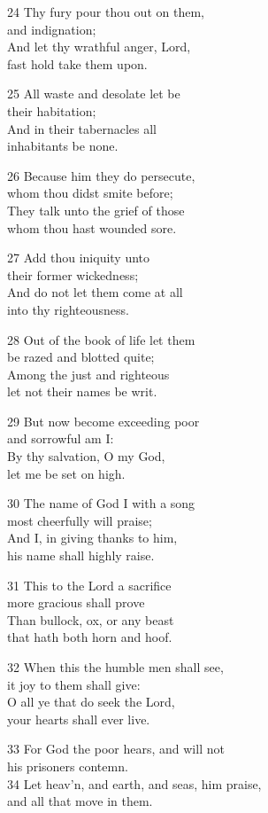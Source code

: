 \begin{multicols}{3}
24 Thy fury pour thou out on them,\\
and indignation;\\
And let thy wrathful anger, Lord,\\
fast hold take them upon.

25 All waste and desolate let be\\
their habitation;\\
And in their tabernacles all\\
inhabitants be none.

26 Because him they do persecute,\\
whom thou didst smite before;\\
They talk unto the grief of those\\
whom thou hast wounded sore.

27 Add thou iniquity unto\\
their former wickedness;\\
And do not let them come at all\\
into thy righteousness.

28 Out of the book of life let them\\
be razed and blotted quite;\\
Among the just and righteous\\
let not their names be writ.

29 But now become exceeding poor\\
and sorrowful am I:\\
By thy salvation, O my God,\\
let me be set on high.

30 The name of God I with a song\\
most cheerfully will praise;\\
And I, in giving thanks to him,\\
his name shall highly raise.

31 This to the Lord a sacrifice\\
more gracious shall prove\\
Than bullock, ox, or any beast\\
that hath both horn and hoof.

32 When this the humble men shall see,\\
it joy to them shall give:\\
O all ye that do seek the Lord,\\
your hearts shall ever live.

33 For God the poor hears, and will not\\
his prisoners contemn.\\
34 Let heav’n, and earth, and seas, him praise,\\
and all that move in them.


\end{multicols}
